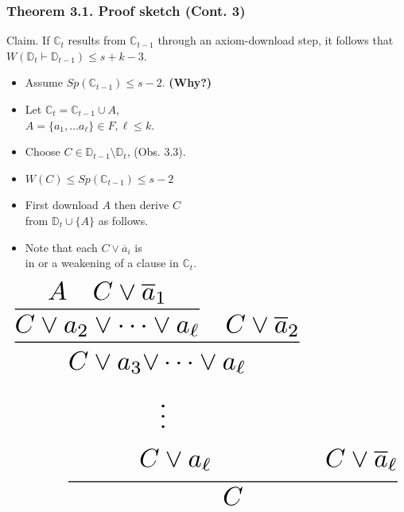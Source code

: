 \documentclass[t,usenames,dvipsnames]{beamer}
\begin{document}
\begin{frame}\frametitle{Theorem 3.1. Proof sketch (Cont. 3)}
	\begin{block}{Claim.}
		If $\mathbb{C}_t$ results from $\mathbb{C}_{t-1}$ through an axiom-download step, it
		follows that $W(\mathbb{D}_t \vdash \mathbb{D}_{t-1}) \leq s + k - 3$.
	\end{block}
	\pause
	\begin{minipage}[t]{0.6\linewidth}
	\begin{itemize}[<+->]
		\item Assume $Sp(\mathbb{C}_{t-1}) \leq s - 2$. \textbf{(Why?)}
		\item Let $\mathbb{C}_t = \mathbb{C}_{t-1} \cup A$,\\
			$A = \{a_1, \dots a_{\ell}\} \in F, \ell \leq k$.
		\item Choose $C \in \mathbb{D}_{t-1} \setminus \mathbb{D}_t$, (Obs. 3.3).
		\item[] $W(C) \leq Sp(\mathbb{C}_{t-1}) \leq s-2$ 
		\item First download $A$ then derive $C$\\
			from $\mathbb{D}_{t} \cup \{A\}$ as follows.
		\item Note that each $C \lor \overline a_i$ is\\
			in or a weakening of a clause in $\mathbb{C}_t$.
	\end{itemize}
	\end{minipage}%
	\hfill%
	\begin{minipage}[t]{0.39\linewidth}
	\pause
	$$
	\resizebox{\hsize}{!}{%
	\infer{C}{
		\infer{\begin{aligned}C \lor a_3 \lor& \dots \lor a_{\ell}\\ &\vdots\\ C &\lor
		a_{\ell} \end{aligned}}
		{
			\infer{C \lor a_2 \lor \dots \lor a_{\ell}}
			{A & C\lor \overline a_1}
		     	&C \lor \overline a_2
		}
	& \begin{aligned}\vphantom{A}\\ \vphantom{\vdots}\\ C \lor \overline
	a_{\ell}\end{aligned}}%
	}
	$$
	\end{minipage}
\end{frame}
\end{document}
